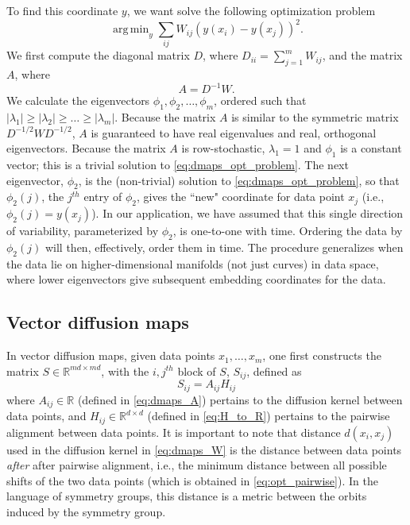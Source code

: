 \documentclass[12pt]{article}
\DeclareMathOperator*{\argmin}{arg\,min}
\begin{document}
To find this coordinate $y$, we want solve the following optimization problem \cite{Belkin2003}
\begin{equation} \label{eq:dmaps_opt_problem}
\argmin_{y} \sum_{ij} W_{ij} (y(x_i) - y(x_j))^2.
\end{equation}
%
We first compute the diagonal matrix $D$, where $D_{ii} = \sum_{j=1}^{m} W_{ij}$, and the matrix $A$, where
\begin{equation} \label{eq:dmaps_A}
A = D^{-1} W.
\end{equation}
%
We calculate the eigenvectors $\phi_1, \phi_2, \dots, \phi_m$, ordered such that $|\lambda_1| \ge |\lambda_2| \ge \dots \ge |\lambda_m|$.
%
Because the matrix $A$ is similar to the symmetric matrix $D^{-1/2} W D^{-1/2}$, $A$ is guaranteed to have real eigenvalues and real, orthogonal eigenvectors.
%
Because the matrix $A$ is row-stochastic, $\lambda_1=1$ and $\phi_1$ is a constant vector; this is a trivial solution to \eqref{eq:dmaps_opt_problem}.
%
%
The next eigenvector, $\phi_2$, is the (non-trivial) solution to \eqref{eq:dmaps_opt_problem}, so that $\phi_2(j)$, the $j^{th}$ entry of $\phi_2$, gives the ``new" coordinate for data point $x_j$ (i.e., $\phi_2(j) = y(x_j)$).
%
In our application, we have assumed that this single direction of variability, parameterized by $\phi_2$, is one-to-one with time.
%
Ordering the data by $\phi_2(j)$ will then, effectively, order them in time.
%
The procedure generalizes when the data lie on higher-dimensional manifolds (not just curves) in data space, where lower eigenvectors give subsequent embedding coordinates for the data. 

\subsection{Vector diffusion maps\cite{singer2012vector}}

In vector diffusion maps, given data points $x_1, \dots, x_m$, one first constructs the matrix $S \in \mathbb{R}^{md \times md}$, with the $i,j^{th}$ block of $S$, $S_{ij}$, defined as
\begin{equation} \label{eq:vdm_S}
	S_{ij} = A_{ij} H_{ij}
\end{equation}
%
where $A_{ij} \in \mathbb{R}$ (defined in \eqref{eq:dmaps_A}) pertains to the diffusion kernel between data points, and $H_{ij} \in \mathbb{R}^{d \times d}$ (defined in \eqref{eq:H_to_R}) pertains to the pairwise alignment between data points.
%
It is important to note that distance $d(x_i, x_j)$ used in the diffusion kernel in \eqref{eq:dmaps_W} is the distance between data points {\it after} after pairwise alignment, i.e., the minimum distance between all possible shifts of the two data points (which is obtained in \eqref{eq:opt_pairwise}).
%
In the language of symmetry groups, this distance is a metric between the orbits induced by the symmetry group.
\end{document}
